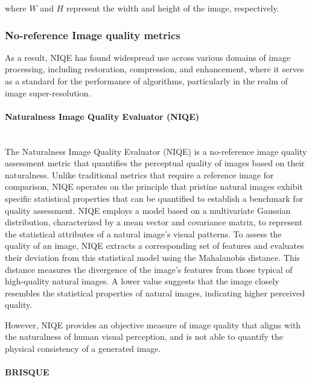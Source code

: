             \noindent where $W$ and $H$ represent the width and height of the image, respectively.
    

        

        \subsubsection{No-reference Image quality metrics}

        As a result, NIQE has found widespread use across various domains of image processing, including restoration, compression, and enhancement, where it serves as a standard for the performance of algorithms, particularly in the realm of image super-resolution.

        \paragraph{Naturalness Image Quality Evaluator (NIQE)}\mbox{} \\

        
            The Naturalness Image Quality Evaluator (NIQE) \cite{niqe} is a no-reference image quality assessment metric that quantifies the perceptual quality of images based on their naturalness. Unlike traditional metrics that require a reference image for comparison, NIQE operates on the principle that pristine natural images exhibit specific statistical properties that can be quantified to establish a benchmark for quality assessment. NIQE employs a model based on a multivariate Gaussian distribution, characterized by a mean vector and covariance matrix, to represent the statistical attributes of a natural image's visual patterns. To assess the quality of an image, NIQE extracts a corresponding set of features and evaluates their deviation from this statistical model using the Mahalanobis distance. This distance measures the divergence of the image's features from those typical of high-quality natural images. A lower value suggests that the image closely resembles the statistical properties of natural images, indicating higher perceived quality.
            
            However, NIQE provides an objective measure of image quality that aligns with the naturalness of human visual perception, and is not able to quantify the physical consistency of a generated image.
        \paragraph{BRISQUE}

